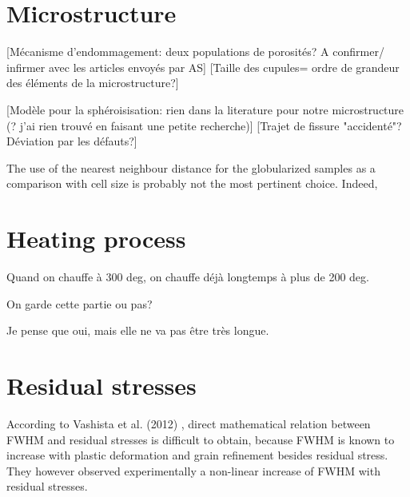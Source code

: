\section{Microstructure}
\label{DMMM}
[Mécanisme d'endommagement: deux populations de porosités? A confirmer/ infirmer avec les articles envoyés par AS]
[Taille des cupules= ordre de grandeur des éléments de la microstructure?] 

[Modèle pour la sphéroisisation: rien dans la literature pour notre microstructure (? j'ai rien trouvé en faisant une petite recherche)]
[Trajet de fissure "accidenté"? Déviation par les défauts?]

The use of the nearest neighbour distance for the globularized samples as a comparison with cell size is probably not the most pertinent choice. Indeed, 

\section{Heating process}
Quand on chauffe à 300 deg, on chauffe déjà longtemps à plus de 200 deg.

 On garde cette partie ou pas?
 
 Je pense que oui, mais elle ne va pas être très longue.






\label{D-MP}

\section{Residual stresses}

According to Vashista et al. (2012) \cite{Vashista12}, direct mathematical relation between FWHM and residual stresses is difficult to obtain, because FWHM is known to increase with plastic deformation and grain refinement besides residual stress. They however observed experimentally a non-linear increase of FWHM with residual stresses.\\

